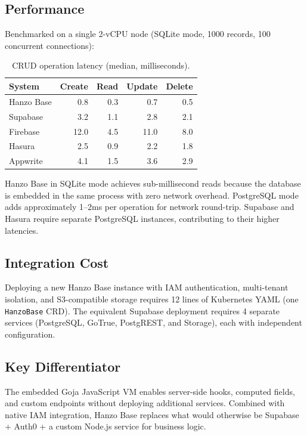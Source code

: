 \subsection{Performance}

Benchmarked on a single 2-vCPU node (SQLite mode, 1000 records, 100 concurrent connections):

\begin{table}[H]
\centering
\caption{CRUD operation latency (median, milliseconds).}
\footnotesize
\begin{tabular}{@{}lrrrr@{}}
\toprule
System & Create & Read & Update & Delete \\
\midrule
Hanzo Base & 0.8 & 0.3 & 0.7 & 0.5 \\
Supabase & 3.2 & 1.1 & 2.8 & 2.1 \\
Firebase & 12.0 & 4.5 & 11.0 & 8.0 \\
Hasura & 2.5 & 0.9 & 2.2 & 1.8 \\
Appwrite & 4.1 & 1.5 & 3.6 & 2.9 \\
\bottomrule
\end{tabular}
\end{table}

Hanzo Base in SQLite mode achieves sub-millisecond reads because the database is embedded in the same process with zero network overhead. PostgreSQL mode adds approximately 1--2ms per operation for network round-trip. Supabase and Hasura require separate PostgreSQL instances, contributing to their higher latencies.

\subsection{Integration Cost}

Deploying a new Hanzo Base instance with IAM authentication, multi-tenant isolation, and S3-compatible storage requires 12 lines of Kubernetes YAML (one \texttt{HanzoBase} CRD). The equivalent Supabase deployment requires 4 separate services (PostgreSQL, GoTrue, PostgREST, and Storage), each with independent configuration.

\subsection{Key Differentiator}

The embedded Goja JavaScript VM enables server-side hooks, computed fields, and custom endpoints without deploying additional services. Combined with native IAM integration, Hanzo Base replaces what would otherwise be Supabase + Auth0 + a custom Node.js service for business logic.

